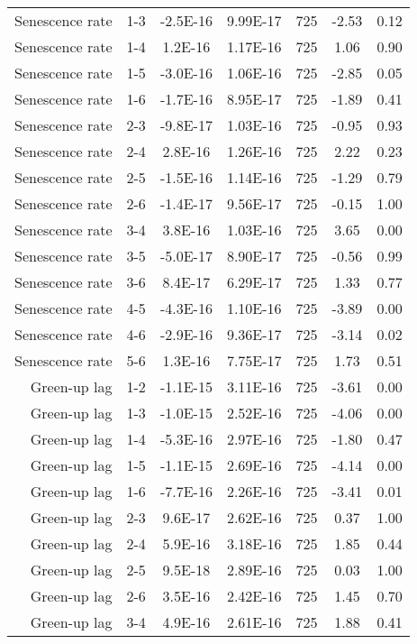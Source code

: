 \begin{table}[H]
\begin{tabular}{rcccccc}
  Senescence rate & 1-3 & -2.5E-16 & 9.99E-17 & 725 & -2.53 & 0.12 \\ 
  Senescence rate & 1-4 & 1.2E-16 & 1.17E-16 & 725 & 1.06 & 0.90 \\ 
  Senescence rate & 1-5 & -3.0E-16 & 1.06E-16 & 725 & -2.85 & 0.05 \\ 
  Senescence rate & 1-6 & -1.7E-16 & 8.95E-17 & 725 & -1.89 & 0.41 \\ 
  Senescence rate & 2-3 & -9.8E-17 & 1.03E-16 & 725 & -0.95 & 0.93 \\ 
  Senescence rate & 2-4 & 2.8E-16 & 1.26E-16 & 725 & 2.22 & 0.23 \\ 
  Senescence rate & 2-5 & -1.5E-16 & 1.14E-16 & 725 & -1.29 & 0.79 \\ 
  Senescence rate & 2-6 & -1.4E-17 & 9.56E-17 & 725 & -0.15 & 1.00 \\ 
  Senescence rate & 3-4 & 3.8E-16 & 1.03E-16 & 725 & 3.65 & 0.00 \\ 
  Senescence rate & 3-5 & -5.0E-17 & 8.90E-17 & 725 & -0.56 & 0.99 \\ 
  Senescence rate & 3-6 & 8.4E-17 & 6.29E-17 & 725 & 1.33 & 0.77 \\ 
  Senescence rate & 4-5 & -4.3E-16 & 1.10E-16 & 725 & -3.89 & 0.00 \\ 
  Senescence rate & 4-6 & -2.9E-16 & 9.36E-17 & 725 & -3.14 & 0.02 \\ 
  Senescence rate & 5-6 & 1.3E-16 & 7.75E-17 & 725 & 1.73 & 0.51 \\ 
  Green-up lag & 1-2 & -1.1E-15 & 3.11E-16 & 725 & -3.61 & 0.00 \\ 
  Green-up lag & 1-3 & -1.0E-15 & 2.52E-16 & 725 & -4.06 & 0.00 \\ 
  Green-up lag & 1-4 & -5.3E-16 & 2.97E-16 & 725 & -1.80 & 0.47 \\ 
  Green-up lag & 1-5 & -1.1E-15 & 2.69E-16 & 725 & -4.14 & 0.00 \\ 
  Green-up lag & 1-6 & -7.7E-16 & 2.26E-16 & 725 & -3.41 & 0.01 \\ 
  Green-up lag & 2-3 & 9.6E-17 & 2.62E-16 & 725 & 0.37 & 1.00 \\ 
  Green-up lag & 2-4 & 5.9E-16 & 3.18E-16 & 725 & 1.85 & 0.44 \\ 
  Green-up lag & 2-5 & 9.5E-18 & 2.89E-16 & 725 & 0.03 & 1.00 \\ 
  Green-up lag & 2-6 & 3.5E-16 & 2.42E-16 & 725 & 1.45 & 0.70 \\ 
  Green-up lag & 3-4 & 4.9E-16 & 2.61E-16 & 725 & 1.88 & 0.41 \\ 

\end{tabular}
\end{table}
